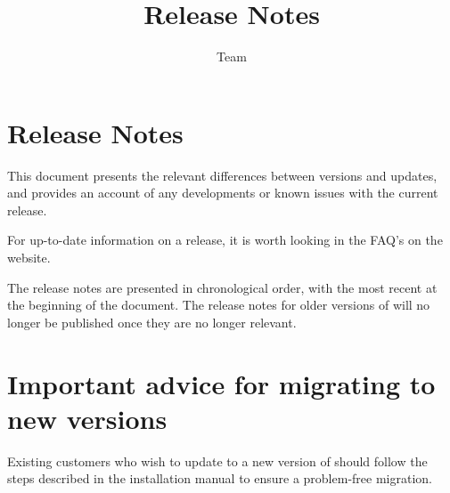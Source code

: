 
\title{\app{} Release Notes}
\author*{\app{} Team}{}
\maketitle

\setcounter{secnumdepth}{0}

\clearpage
\section{\app{} Release Notes}
This document presents the relevant differences between versions and updates, and provides an account of any developments or known issues with the current release. 

For up-to-date information on a release, it is worth looking in the FAQ's on the \app{} website. 

The release notes are presented in chronological order, with the most recent at the beginning of the document. The release notes for older versions of \app{}  will no longer be published once they are no longer relevant. 

\section{Important advice for migrating to new \app{} versions}
Existing customers who wish to update to a new version of \app{} should follow the steps described in the installation manual to ensure a problem-free migration.






